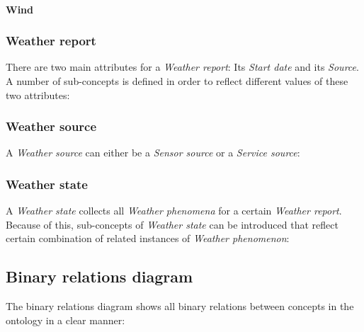 \paragraph{Wind}

\subsubsection{Weather report}

There are two main attributes for a \emph{Weather report}: Its \emph{Start date} and its \emph{Source}. A number of sub-concepts is defined in order to reflect different values of these two attributes:


\subsubsection{Weather source}

A \emph{Weather source} can either be a \emph{Sensor source} or a \emph{Service source}:


\subsubsection{Weather state}

A \emph{Weather state} collects all \emph{Weather phenomena} for a certain \emph{Weather report}. Because of this, sub-concepts of \emph{Weather state} can be introduced that reflect certain combination of related instances of \emph{Weather phenomenon}:


\subsection{Binary relations diagram}
\label{sec:binary_relations_diagram}

The binary relations diagram shows all binary relations between concepts in the ontology in a clear manner:



